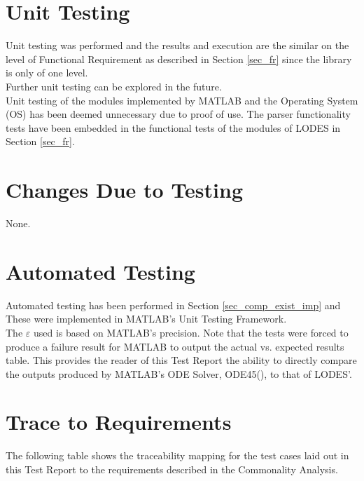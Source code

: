 \documentclass[12pt, titlepage]{article}
\newcommand{\famname}{LODES} %
\begin{document}
\section{Unit Testing} \label{sec_ut}
Unit testing was performed and the results and execution are the similar
on the level of Functional Requirement as described in Section \ref{sec_fr}
since the library is only of one level.\\

Further unit testing can be explored in the future.\\

Unit testing of the modules implemented by MATLAB and the Operating System (OS)
has been deemed unnecessary due to proof of use. The parser functionality
tests have been embedded in the functional tests of the modules of \famname{} in
Section \ref{sec_fr}.

\section{Changes Due to Testing} \label{sec_changes}

None.

\section{Automated Testing} \label{sec_at}

Automated testing has been performed in Section \ref{sec_comp_exist_imp} and 
These were implemented in MATLAB's Unit Testing Framework.\\

The $\varepsilon$ used is based on MATLAB's precision.
Note that the tests were forced to produce a failure result for MATLAB to
output the actual vs. expected results table. This provides the reader of this
Test Report the ability to directly compare the outputs produced by MATLAB's ODE Solver, ODE45(),
to that of LODES'.
		
\section{Trace to Requirements} \label{sec_trace_req}

The following table shows the traceability mapping for the test cases laid out in this Test Report to the requirements 
described in the Commonality Analysis.
\end{document}
